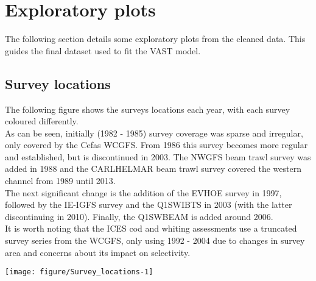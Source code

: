 \documentclass[12pt]{article}\usepackage[]{graphicx}\usepackage[]{color}
\newenvironment{knitrout}{}{} %
\begin{document}




\section{Exploratory plots}

The following section details some exploratory plots from the cleaned data.
This guides the final dataset used to fit the VAST model.




\subsection{Survey locations}

The following figure shows the surveys locations each year, with each survey
coloured differently.\\

As can be seen, initially (1982 - 1985) survey coverage was sparse and
irregular, only covered by the Cefas WCGFS. From 1986 this survey becomes more
regular and established, but is discontinued in 2003. The NWGFS beam trawl
survey was added in 1988 and the CARLHELMAR beam trawl survey covered the
western channel from 1989 until 2013.\\

The next significant change is the addition of the EVHOE survey in 1997,
followed by the IE-IGFS survey and the Q1SWIBTS in 2003 (with the latter
discontinuing in 2010). Finally, the Q1SWBEAM is added around 2006. \\

It is worth noting that the ICES cod and whiting assessments use a truncated
survey series from the WCGFS, only using 1992 - 2004 due to changes in survey
area and concerns about its impact on selectivity. \\

\begin{landscape}

\begin{knitrout}\footnotesize
{}\color{fgcolor}
\texttt{[image: figure/Survey\_locations-1]} 

\end{knitrout}

\end{landscape}
\end{document}

